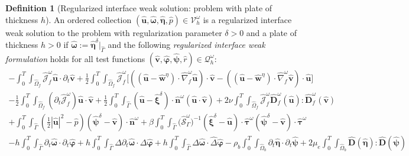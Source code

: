 \documentclass[11pt]{article}
\newcommand{\bd}{\boldsymbol}
\theoremstyle{definition}
\newtheorem{definition}{Definition}[section]
\begin{document}
\begin{definition}[Regularized interface weak solution: problem with plate of thickness $h$]\label{plateweak}
An ordered collection $(\hat{\bd{u}}, \hat{\bd{\omega}}, \hat{\bd{\eta}}, \hat{p}) \in \mathcal{V}^{\omega}_{h}$ is a regularized interface weak solution to the problem with regularization parameter $\delta > 0$ and a plate of thickness $h > 0$ if $\hat{\bd{\omega}} := \hat{\bd{\eta}}^{\delta}|_{\hat{\Gamma}}$ and the following \textit{regularized interface weak formulation} holds for all test functions $(\hat{\bd{v}}, \hat{\bd{\varphi}}, \hat{\bd{\psi}}, \hat{r}) \in \mathcal{Q}^{\omega}_{h}$:
\begin{multline*}
-\int_{0}^{T} \int_{\hat{\Omega}_{f}} \hat{\mathcal{J}}^{\omega}_{f} \hat{\bd{u}} \cdot \partial_{t} \hat{\bd{v}} + \frac{1}{2} \int_{0}^{T} \int_{\hat{\Omega}_{f}} \hat{\mathcal{J}}^{\omega}_{f} \Big[((\hat{\bd{u}} - \hat{\bd{w}}^{\eta}) \cdot \hat{\nabla}^{\omega}_{f} \hat{\bd{u}}) \cdot \hat{\bd{v}} - ((\hat{\bd{u}} - \hat{\bd{w}}^{\eta}) \cdot \hat{\nabla}^{\omega}_{f} \hat{\bd{v}}) \cdot \hat{\bd{u}}\Big] \\
- \frac{1}{2} \int_{0}^{T} \int_{\hat{\Omega}_{f}} (\partial_{t}\hat{\mathcal{J}}^{\omega}_{f}) \hat{\bd{u}} \cdot \hat{\bd{v}} + \frac{1}{2} \int_{0}^{T} \int_{\hat{\Gamma}} (\hat{\bd{u}} - \hat{\bd{\xi}}^{\delta}) \cdot \hat{\bd{n}}^{\omega} (\hat{\bd{u}} \cdot \hat{\bd{v}}) + 2\nu \int_{0}^{T} \int_{\hat{\Omega}_{f}} \hat{\mathcal{J}}^{\omega}_{f} \hat{\bd{D}}^{\omega}_{f}(\hat{\bd{u}}) : \hat{\bd{D}}^{\omega}_{f}(\hat{\bd{v}}) \\
+ \int_{0}^{T} \int_{\hat{\Gamma}} \left(\frac{1}{2} |\hat{\bd{u}}|^{2} - \hat{p}\right) (\hat{\bd{\psi}}^{\delta} - \hat{\bd{v}}) \cdot \hat{\bd{n}}^{\omega} + \beta \int_{0}^{T} \int_{\hat{\Gamma}} \Big(\hat{\mathcal{S}}^{\omega}_{\Gamma}\Big)^{-1} (\hat{\bd{\xi}}^{\delta} - \hat{\bd{u}}) \cdot \hat{\bd{\tau}}^{\omega} (\hat{\bd{\psi}}^{\delta} - \hat{\bd{v}}) \cdot \hat{\bd{\tau}}^{\omega} \\
- h \int_{0}^{T} \int_{\hat{\Gamma}} \partial_{t}\hat{\bd{\omega}} \cdot \partial_{t} \hat{\bd{\varphi}} + h \int_{0}^{T} \int_{\hat{\Gamma}} \Delta \partial_{t} \hat{\bd{\omega}} \cdot \Delta \hat{\bd{\varphi}} + h \int_{0}^{T} \int_{\hat{\Gamma}} \hat{\Delta} \hat{\bd{\omega}} \cdot \hat{\Delta} \hat{\bd{\varphi}} - \rho_{b} \int_{0}^{T} \int_{\hat{\Omega}_{b}} \partial_{t} \hat{\bd{\eta}} \cdot \partial_{t} \hat{\bd{\psi}} + 2\mu_{e} \int_{0}^{T} \int_{\hat{\Omega}_{b}} \hat{\bd{D}}(\hat{\bd{\eta}}) : \hat{\bd{D}}(\hat{\bd{\psi}}) \\

\end{multline*}
\end{definition}
\end{document}
